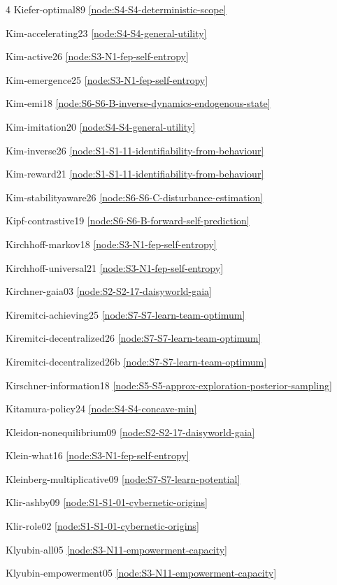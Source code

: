 \documentclass[10pt]{article}
\begin{document}
{\begin{multicols}{4}
Kiefer-optimal89 \hfill \ref{node:S4-S4-deterministic-scope}\par
Kim-accelerating23 \hfill \ref{node:S4-S4-general-utility}\par
Kim-active26 \hfill \ref{node:S3-N1-fep-self-entropy}\par
Kim-emergence25 \hfill \ref{node:S3-N1-fep-self-entropy}\par
Kim-emi18 \hfill \ref{node:S6-S6-B-inverse-dynamics-endogenous-state}\par
Kim-imitation20 \hfill \ref{node:S4-S4-general-utility}\par
Kim-inverse26 \hfill \ref{node:S1-S1-11-identifiability-from-behaviour}\par
Kim-reward21 \hfill \ref{node:S1-S1-11-identifiability-from-behaviour}\par
Kim-stabilityaware26 \hfill \ref{node:S6-S6-C-disturbance-estimation}\par
Kipf-contrastive19 \hfill \ref{node:S6-S6-B-forward-self-prediction}\par
Kirchhoff-markov18 \hfill \ref{node:S3-N1-fep-self-entropy}\par
Kirchhoff-universal21 \hfill \ref{node:S3-N1-fep-self-entropy}\par
Kirchner-gaia03 \hfill \ref{node:S2-S2-17-daisyworld-gaia}\par
Kiremitci-achieving25 \hfill \ref{node:S7-S7-learn-team-optimum}\par
Kiremitci-decentralized26 \hfill \ref{node:S7-S7-learn-team-optimum}\par
Kiremitci-decentralized26b \hfill \ref{node:S7-S7-learn-team-optimum}\par
Kirschner-information18 \hfill \ref{node:S5-S5-approx-exploration-posterior-sampling}\par
Kitamura-policy24 \hfill \ref{node:S4-S4-concave-min}\par
Kleidon-nonequilibrium09 \hfill \ref{node:S2-S2-17-daisyworld-gaia}\par
Klein-what16 \hfill \ref{node:S3-N1-fep-self-entropy}\par
Kleinberg-multiplicative09 \hfill \ref{node:S7-S7-learn-potential}\par
Klir-ashby09 \hfill \ref{node:S1-S1-01-cybernetic-origins}\par
Klir-role02 \hfill \ref{node:S1-S1-01-cybernetic-origins}\par
Klyubin-all05 \hfill \ref{node:S3-N11-empowerment-capacity}\par
Klyubin-empowerment05 \hfill \ref{node:S3-N11-empowerment-capacity}\par

\end{multicols}}
\end{document}

